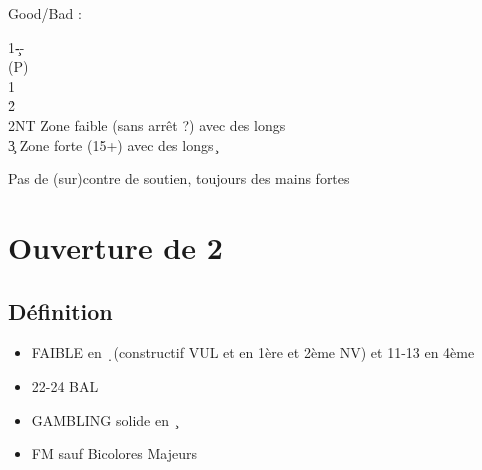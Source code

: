 \documentclass[a4paper]{article}
\begin{document}
Good/Bad :

\begin{bidtable}
1\c--\+\\
(P)\+\\
1\s\+\\
2\h\+\\
2NT \> Zone faible (sans arrêt ?) avec des longs \c \\
3\c \> Zone forte (15+) avec des longs \c \-\-\-\-
\end{bidtable}

Pas de (sur)contre de soutien, toujours des mains fortes

\section{Ouverture de 2\pdfc}

\subsection{Définition}

\begin{itemize}
\item FAIBLE en \d\ (constructif VUL et en 1ère et 2ème NV) et 11-13 en 4ème

\item 22-24 BAL

\item GAMBLING solide en \c\ 

\item FM sauf Bicolores Majeurs

\end{itemize}
\end{document}

